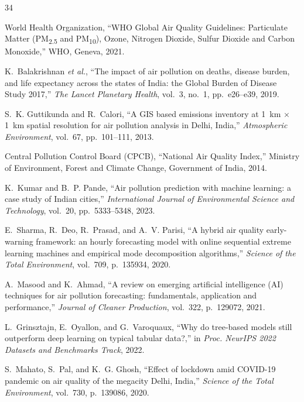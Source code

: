 \documentclass[conference]{IEEEtran}
\begin{document}
\begin{thebibliography}{34}

World Health Organization, ``WHO Global Air Quality Guidelines: Particulate Matter (PM\textsubscript{2.5} and PM\textsubscript{10}), Ozone, Nitrogen Dioxide, Sulfur Dioxide and Carbon Monoxide,'' WHO, Geneva, 2021.

K.~Balakrishnan \textit{et al.}, ``The impact of air pollution on deaths, disease burden, and life expectancy across the states of India: the Global Burden of Disease Study 2017,'' \textit{The Lancet Planetary Health}, vol.~3, no.~1, pp.~e26--e39, 2019.

S.~K. Guttikunda and R.~Calori, ``A GIS based emissions inventory at 1~km $\times$ 1~km spatial resolution for air pollution analysis in Delhi, India,'' \textit{Atmospheric Environment}, vol.~67, pp.~101--111, 2013.

Central Pollution Control Board (CPCB), ``National Air Quality Index,'' Ministry of Environment, Forest and Climate Change, Government of India, 2014.

K.~Kumar and B.~P. Pande, ``Air pollution prediction with machine learning: a case study of Indian cities,'' \textit{International Journal of Environmental Science and Technology}, vol.~20, pp.~5333--5348, 2023.

E.~Sharma, R.~Deo, R.~Prasad, and A.~V. Parisi, ``A hybrid air quality early-warning framework: an hourly forecasting model with online sequential extreme learning machines and empirical mode decomposition algorithms,'' \textit{Science of the Total Environment}, vol.~709, p.~135934, 2020.

A.~Masood and K.~Ahmad, ``A review on emerging artificial intelligence (AI) techniques for air pollution forecasting: fundamentals, application and performance,'' \textit{Journal of Cleaner Production}, vol.~322, p.~129072, 2021.

L.~Grinsztajn, E.~Oyallon, and G.~Varoquaux, ``Why do tree-based models still outperform deep learning on typical tabular data?,'' in \textit{Proc. NeurIPS 2022 Datasets and Benchmarks Track}, 2022.

S.~Mahato, S.~Pal, and K.~G. Ghosh, ``Effect of lockdown amid COVID-19 pandemic on air quality of the megacity Delhi, India,'' \textit{Science of the Total Environment}, vol.~730, p.~139086, 2020.


\end{thebibliography}
\end{document}
